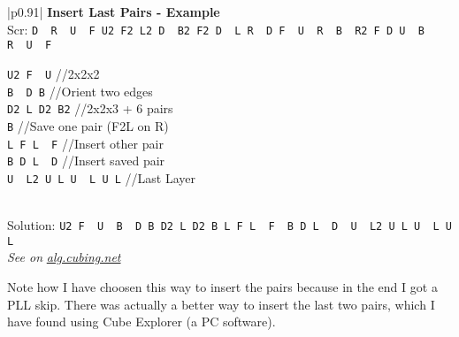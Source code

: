 \documentclass[11pt,a4paper]{book}
\newcommand{\p}{\textquotesingle}
\newcommand{\m}{\texttt}
\newcommand{\ps}{\p\,\,}
\newcommand{\comment}[1]{{\color{gray}\quad//#1}}
\begin{document}
\bigskip
\begin{tabular}{|p{}|}
\hline
\textbf{Insert Last Pairs - Example}\\
\hline
Scr: \m{D\ps R\ps U\ps F U2 F2 L2 D\ps B2 F2 D\ps L R\ps D F\ps U\ps R\ps B\ps R2 F D U\ps B\ps R\ps U\ps F }\\
\hline
\begin{minipage}[l]{0.650\textwidth}
\m{U2 F\ps U\p} \comment{2x2x2}\\
\m{B\ps D B} \comment{Orient two edges}\\
\m{D2 L D2 B2} \comment{2x2x3 + 6 pairs}\\
\m{B\p} \comment{Save one pair (F2L on R)}\\
\m{L F L\ps F\p} \comment{Insert other pair}\\
\m{B D L\ps D\p} \comment{Insert saved pair}\\
\m{U\ps L2 U L U\ps L U L\p} \comment{Last Layer}
\end{minipage}
\begin{minipage}[c]{0.25\textwidth}

\end{minipage}\\
\hline
Solution: \m{U2 F\ps U\ps B\ps D B D2 L D2 B L F L\ps F\ps B D L\ps D\ps U\ps L2 U L U\ps L U L\p}\\
\hline
\emph{See on }\href{https://alg.cubing.net/?setup=D-_R-_U-_F_U2_F2_L2_D-_B2_F2_D-_L_R-_D_F-_U-_R-_B-_R2_F_D_U-_B-_R-_U-_F&alg=U2_F-_U-_\%2F\%2F2x2x2\%0AB-_D_B_\%2F\%2FOrient_two_edges\%0AD2_L_D2_B2_\%2F\%2F2x2x3_\%26\%232b\%3B_6_pairs\%0AB-_\%2F\%2FSave_one_pair_(for_F2L_on_R)\%0AL_F_L-_F-_\%2F\%2FInsert_other_pair\%0AB_D_L-_D-_\%2F\%2FInsert_saved_pair\%0AU-_L2_U_L_U-_L_U_L-_\%2F\%2FLast_Layer}{\emph{alg.cubing.net}}\\
\hline
\end{tabular}
\bigskip

Note how I have choosen this way to insert the pairs because in the end I got a PLL skip. There was actually a better way to insert the last two pairs, which I have found using Cube Explorer (a PC software).
\end{document}
